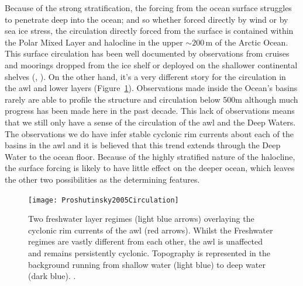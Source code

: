 \documentclass[10pt,a4paper]{report}
\newcommand*\figref[1]{Figure~\ref{#1}}
\begin{document}
Because of the strong stratification, the forcing from the ocean surface 
struggles to penetrate deep into the ocean; and so whether forced directly by wind 
or by sea ice stress, the circulation
directly forced from the surface is contained within the Polar Mixed Layer 
and halocline in the upper ${\sim}200\,\mathrm{m}$ of the Arctic Ocean. 
This surface circulation has been well documented by observations
from cruises and moorings  dropped  from  the  ice  shelf  or  deployed  on 
the  shallower  continental  shelves (\cite{gerdes1997large}, \cite{jones2001circulation}). On the other hand, it's a very different
story for the circulation in the \gls{awl} and lower layers (\figref{fig:Proshutinsky2005Circulation}). Observations made
inside the Ocean's basins rarely are able to profile the structure  and
circulation  below 500m  although much progress has been made here in the
past decade. This lack of observations means that  we  still only have  a  sense  of  the circulation 
of the \gls{awl} and the Deep  Waters.  The  observations  we  do 
have  infer stable cyclonic  rim  currents about each of the basins in the
\gls{awl} and it is believed that this trend extends through the Deep Water to the 
ocean floor.  Because of the highly stratified nature of the halocline, the surface forcing 
is likely to have little effect on the deeper ocean, which leaves the other 
two possibilities as the determining features.


\begin{figure}
	\centering
	\texttt{[image: Proshutinsky2005Circulation]}
	\caption[\cite{proshutinsky2005arctic}]{ Two freshwater layer regimes (light 
		blue arrows) overlaying the cyclonic rim currents of the \gls{awl} (red arrows).
		Whilst the Freshwater regimes are vastly different from each other, the
		\gls{awl} is unaffected and remains persistently cyclonic.
		Topography is represented in the background running from 
		shallow water (light blue) to deep water (dark blue).  \cite{proshutinsky2005arctic}.}
	\label{fig:Proshutinsky2005Circulation}
\end{figure}
\end{document}
